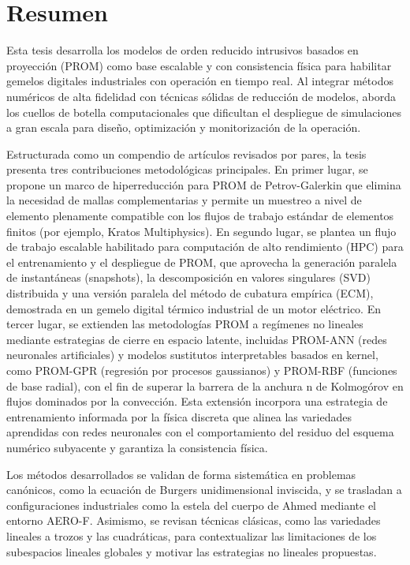\chapter*{Resumen}

\noindent
Esta tesis desarrolla los modelos de orden reducido intrusivos basados en proyección (PROM) como base escalable y con consistencia física para habilitar gemelos digitales industriales con operación en tiempo real. Al integrar métodos numéricos de alta fidelidad con técnicas sólidas de reducción de modelos, aborda los cuellos de botella computacionales que dificultan el despliegue de simulaciones a gran escala para diseño, optimización y monitorización de la operación.

Estructurada como un compendio de artículos revisados por pares, la tesis presenta tres contribuciones metodológicas principales. En primer lugar, se propone un marco de hiperreducción para PROM de Petrov-Galerkin que elimina la necesidad de mallas complementarias y permite un muestreo a nivel de elemento plenamente compatible con los flujos de trabajo estándar de elementos finitos (por ejemplo, Kratos Multiphysics). En segundo lugar, se plantea un flujo de trabajo escalable habilitado para computación de alto rendimiento (HPC) para el entrenamiento y el despliegue de PROM, que aprovecha la generación paralela de instantáneas (snapshots), la descomposición en valores singulares (SVD) distribuida y una versión paralela del método de cubatura empírica (ECM), demostrada en un gemelo digital térmico industrial de un motor eléctrico. En tercer lugar, se extienden las metodologías PROM a regímenes no lineales mediante estrategias de cierre en espacio latente, incluidas PROM-ANN (redes neuronales artificiales) y modelos sustitutos interpretables basados en kernel, como PROM-GPR (regresión por procesos gaussianos) y PROM-RBF (funciones de base radial), con el fin de superar la barrera de la anchura n de Kolmogórov en flujos dominados por la convección. Esta extensión incorpora una estrategia de entrenamiento informada por la física discreta que alinea las variedades aprendidas con redes neuronales con el comportamiento del residuo del esquema numérico subyacente y garantiza la consistencia física.

Los métodos desarrollados se validan de forma sistemática en problemas canónicos, como la ecuación de Burgers unidimensional inviscida, y se trasladan a configuraciones industriales como la estela del cuerpo de Ahmed mediante el entorno AERO-F. Asimismo, se revisan técnicas clásicas, como las variedades lineales a trozos y las cuadráticas, para contextualizar las limitaciones de los subespacios lineales globales y motivar las estrategias no lineales propuestas.

